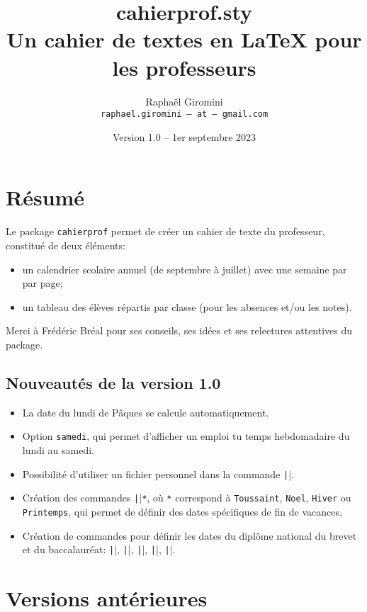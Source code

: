 \documentclass[a4paper,french,10pt]{article}
\title{
  cahierprof.sty\\
  Un cahier de textes en \LaTeX{} pour les professeurs
}
\author{
  Raphaël Giromini\\
  \texttt{raphael.giromini -- at -- gmail.com}
}
\date{Version 1.0 -- 1er septembre 2023}
\begin{document}
\maketitle

\section*{Résumé}
\noindent
Le package \texttt{cahierprof} permet de créer un cahier de texte du professeur,
constitué de deux éléments:
\begin{itemize}
  \item un calendrier scolaire annuel (de septembre à juillet) avec une semaine
    par par page;
  \item un tableau des élèves répartis par classe (pour les absences et/ou les
    notes).
\end{itemize}
Merci à Frédéric Bréal pour ses conseils, ses idées et ses relectures attentives
du package.

\subsection*{Nouveautés de la version 1.0}
\begin{itemize}
  \item La date du lundi de Pâques se calcule automatiquement.
  \item Option \texttt{samedi}, qui permet d'afficher un emploi tu temps
    hebdomadaire du lundi au samedi.
  \item Possibilité d'utiliser un fichier personnel dans la commande
    \texttt|\ListeEleves|.
  \item Création des commandes \texttt|\setFin|\texttt{*}, où
    \texttt{*} correspond à \texttt{Toussaint}, \texttt{Noel}, \texttt{Hiver} ou
    \texttt{Printemps}, qui permet de définir des dates spécifiques de fin de
    vacances. 
  \item Création de commandes pour définir les dates du diplôme national du
    brevet et du baccalauréat: \texttt|\setDNB|,
    \texttt|\setBac|, \texttt|\setBacPhilo|,
    \texttt|\setBacFrancais|, \texttt|\setGO|.
\end{itemize}

\section*{Versions antérieures}
\end{document}
